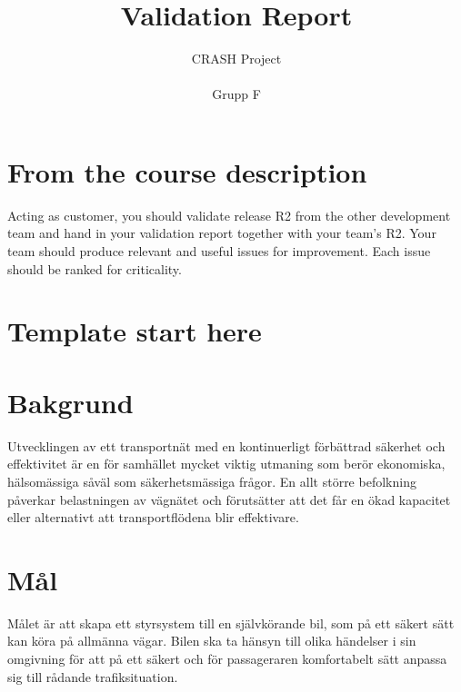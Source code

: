 \documentclass[10pt]{article}
\title{Validation Report}
\author{CRASH Project
\\
\\ Grupp F}
\date{}
\begin{document}

\begin{titlepage}
\clearpage
  \maketitle
\thispagestyle{empty}

\end{titlepage}


\tableofcontents
\thispagestyle{empty}
\newpage
{}
\section{From the course description}
\sloppy
\noindent
Acting as customer, you should validate release R2 from the
other development team and hand in your validation report together with
your team’s R2. Your team should produce relevant and useful issues for
improvement. Each issue should be ranked for criticality.
\section{Template start here}
\newpage
\section{Bakgrund}
\sloppy
\noindent Utvecklingen av ett transportnät med en kontinuerligt förbättrad säkerhet och effektivitet är en för samhället mycket viktig utmaning som berör ekonomiska, hälsomässiga såväl som säkerhetsmässiga frågor. En allt större befolkning påverkar belastningen av vägnätet och förutsätter att det får en ökad kapacitet eller alternativt att transportflödena blir effektivare.

\section{Mål}
\sloppy
\noindent Målet är att skapa ett styrsystem till en självkörande bil, som på ett säkert sätt kan köra på allmänna vägar. Bilen ska ta hänsyn till olika händelser i sin omgivning för att på ett säkert och för passageraren komfortabelt sätt anpassa sig till rådande trafiksituation. 
\end{document}
